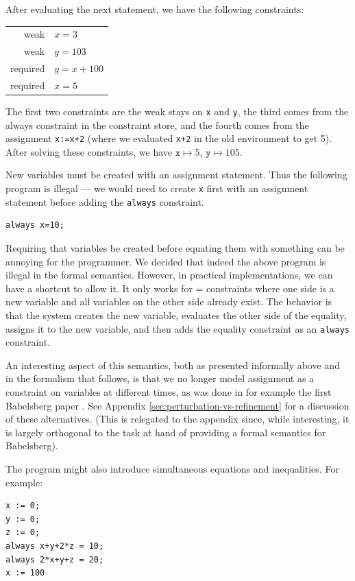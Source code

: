 \documentclass{article}
\begin{document}
After evaluating the next statement, we have the following constraints:

\begin{tabular}{rl}
weak     & $x=3$ \\
weak     & $y=103$ \\
required & $y=x+100$ \\
required & $x=5$
\end{tabular}

The first two constraints are the weak stays on \verb|x| and \verb|y|,
the third comes from the always constraint in the constraint store,
and the fourth comes from the assignment \verb|x:=x+2| (where we
evaluated \verb|x+2| in the old environment to get 5).  After solving
these constraints, we have $\texttt{x} \mapsto 5$, 
$\texttt{y} \mapsto 105$.

New variables must be created with an assignment statement.  Thus
the following program is illegal --- we would need to create
\verb|x| first with an assignment statement before adding the
\verb|always| constraint.

\begin{verbatim}
always x=10;
\end{verbatim}

Requiring that variables be created before equating them with
something can be annoying for the programmer.  We decided that indeed
the above program is illegal in the formal semantics.  However, in
practical implementations, we can have a shortcut to allow it.  It
only works for = constraints where one side is a new variable and
all variables on the other side already exist.  The behavior is
that the system creates the new variable, evaluates the other side
of the equality, assigns it to the new variable, and then adds the
equality constraint as an \verb|always| constraint.

An interesting aspect of this semantics, both as presented informally
above and in the formalism that follows, is that we no longer model
assignment as a constraint on variables at different times, as was
done in for example the first Babelsberg paper
\cite{felgentreff-babelsberg-tr}.  See Appendix
\ref{sec:perturbation-vs-refinement} for a discussion of these
alternatives.  (This is relegated to the appendix since, while
interesting, it is largely orthogonal to the task at hand of providing
a formal semantics for Babelsberg).

The program might also introduce simultaneous equations and
inequalities.  For example:
\begin{verbatim}
x := 0;
y := 0;
z := 0;
always x+y+2*z = 10;
always 2*x+y+z = 20;
x := 100
\end{verbatim}
\end{document}
